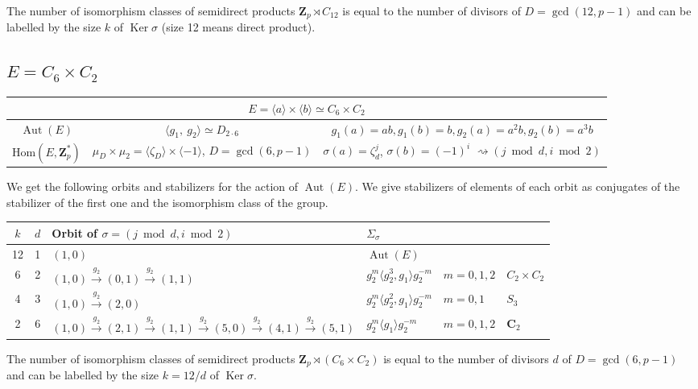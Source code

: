 \documentclass[12pt]{article}
\theoremstyle{definition}
\newcommand{\Z}{\mathbf Z}
\newcommand{\C}{\mathbf C}
\newcommand{\Hom}{\mathrm{Hom}}
\newcommand{\Ker}{\operatorname{Ker}}
\newcommand{\Aut}{\operatorname{Aut}}
\begin{document}
	The number of isomorphism classes of semidirect products
	$\Z_p\rtimes C_{12}$ is equal to the number of divisors of
	$D=\gcd(12,p-1)$
	and can be labelled by the size $k$ of $\Ker\sigma$ (size 12 means direct product).
	
	
	\subsection{$E=C_{6}\times C_2$}\label{C62}


    \begin{center}
    \begin{tabular}{|c|c|c|}
\multicolumn{3}{c}{$E=\langle a\rangle \times \langle b \rangle\simeq C_{6}\times C_2$}\\[1ex]
\hline
$\Aut(E)$ &  $\langle g_1,\ g_2\rangle\simeq D_{2\cdot 6}$ &
	 $g_1(a)=ab,g_1(b)=b,g_2(a)=a^2b,g_2(b)=a^3b$\\[1ex]
$\Hom(E,\Z_p^*)$ & 
$\mu_{D}\times \mu_2=\langle \zeta_D\rangle\times \langle -1\rangle $, $D=\gcd(6,p-1)$ &
$\sigma(a)=\zeta_d^j$, $\sigma(b)=(-1)^i$  $\rightsquigarrow (j\bmod d,i\bmod 2)$\\
\hline
\end{tabular}
  \end{center}  
	
	
	We get the following orbits and stabilizers for the action of $\Aut(E)$. We give stabilizers of elements of each orbit as conjugates of the stabilizer of the first one and the isomorphism class of the group.
	\begin{center}
		\begin{tabular}{c|c|l| lll}
			$k$& $d$ & Orbit of $\sigma=(j\bmod d,i\bmod2)$ 
            & $\Sigma_{\sigma}$ && \\
			\hline
			12&1    &  $(1,0)$ &$\Aut(E)$ &&\\
			6&2    & $(1,0)\xrightarrow{g_2} (0,1)\xrightarrow{g_2} (1,1)$  
            &
            $g_2^m \langle g_2^3, g_1\rangle g_2^{-m}$ & $m=0,1,2$  &$C_2\times C_2$
            \\
			4&3    & $(1,0)\xrightarrow{g_2} (2,0)$ 
            &$g_2^m \langle g_2^2, g_1\rangle g_2^{-m}$&$m=0,1$ &$S_3$ \\
			2&6    & $(1,0)\xrightarrow{g_2} (2,1)\xrightarrow{g_2} (1,1)
			\xrightarrow{g_2} (5,0)\xrightarrow{g_2} (4,1)\xrightarrow{g_2} (5,1)$
            &$g_2^m \langle g_1\rangle g_2^{-m}$&$ m=0,1,2$ & $\C_2$
            \\
		\end{tabular}
	\end{center}
The number of isomorphism classes of semidirect products
	$\Z_p\rtimes ( C_{6}\times C_2)$ is equal to the number of divisors $d$ of
	$D=\gcd(6,p-1)$ 
	and can be labelled by the size $k=12/d$ of $\Ker\sigma$.
\end{document}
